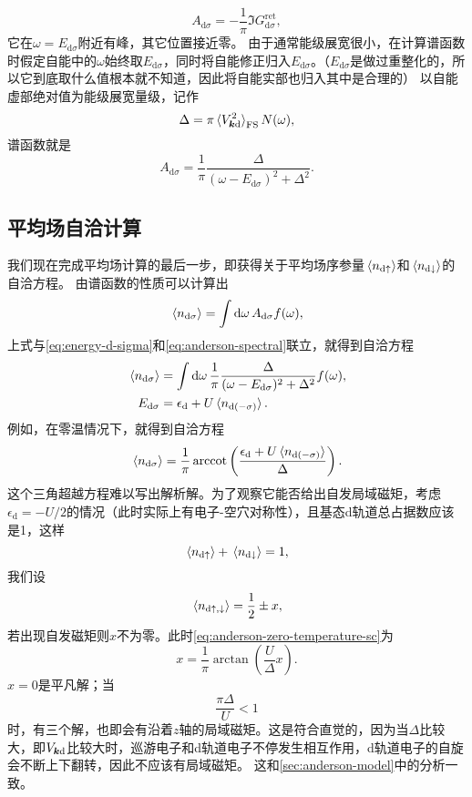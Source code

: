 \[
    A_{\text{d} \sigma} = -\frac{1}{\pi} \Im G_{\text{d} \sigma}^\text{ret},
\]
它在$\omega = E_{\text{d} \sigma}$附近有峰，其它位置接近零。
由于通常能级展宽很小，在计算谱函数时假定自能中的$\omega$始终取$E_{\text{d} \sigma}$，同时将自能修正归入$E_{\text{d} \sigma}$。（$E_{\text{d} \sigma}$是做过重整化的，所以它到底取什么值根本就不知道，因此将自能实部也归入其中是合理的）
以自能虚部绝对值为能级展宽量级，记作
\begin{equation}
    \Delta = \pi \expval*{V_{\vb*{k} \text{d}}^2}_\text{FS} N(\omega),
\end{equation}
谱函数就是
\begin{equation}
    A_{\text{d}\sigma} = \frac{1}{\pi} \frac{\Delta}{(\omega-E_{\text{d}\sigma})^2 + \Delta^2}.
    \label{eq:anderson-spectral}
\end{equation}

\subsection{平均场自洽计算}

我们现在完成平均场计算的最后一步，即获得关于平均场序参量$\expval*{{n}_{\text{d} \uparrow}}$和$\expval*{{n}_{\text{d} \downarrow}}$的自洽方程。
由谱函数的性质可以计算出
\[
    \expval*{{n}_{\text{d} \sigma}} = \int \dd{\omega} A_{\text{d} \sigma} f(\omega),
\]
上式与\eqref{eq:energy-d-sigma}和\eqref{eq:anderson-spectral}联立，就得到自洽方程
\begin{equation}
    \begin{aligned}
        \expval*{{n}_{\text{d} \sigma}} &= \int \dd{\omega} \frac{1}{\pi} \frac{\Delta}{(\omega-E_{\text{d}\sigma})^2 + \Delta^2} f(\omega), \\
        E_{\text{d} \sigma} &= \epsilon_\text{d} + U \expval*{{n}_{\text{d} (-\sigma)}}.
    \end{aligned}
\end{equation}
例如，在零温情况下，就得到自洽方程
\begin{equation}
    \expval*{{n}_{\text{d} \sigma}} = \frac{1}{\pi} \arccot \left( \frac{\epsilon_{\text{d}} + U \expval*{{n}_{\text{d} (-\sigma)}}}{\Delta} \right).
    \label{eq:anderson-zero-temperature-sc}
\end{equation}
这个三角超越方程难以写出解析解。为了观察它能否给出自发局域磁矩，考虑$\epsilon_{\text{d}} = - U / 2$的情况（此时实际上有电子-空穴对称性），且基态d轨道总占据数应该是1，这样
\[
    \expval*{{n}_{\text{d} \uparrow}} + \expval*{{n}_{\text{d} \downarrow}} = 1,
\]
我们设
\[
    \expval*{{n}_{\text{d} \uparrow, \downarrow}} = \frac{1}{2} \pm x,
\]
若出现自发磁矩则$x$不为零。此时\eqref{eq:anderson-zero-temperature-sc}为
\[
    x = \frac{1}{\pi} \arctan \left( \frac{U}{\Delta} x \right).
\]
$x=0$是平凡解；当
\[
    \frac{\pi \Delta}{U} < 1
\]
时，有三个解，也即会有沿着$z$轴的局域磁矩。这是符合直觉的，因为当$\Delta$比较大，即$V_{\vb*{k} \text{d}}$比较大时，巡游电子和d轨道电子不停发生相互作用，d轨道电子的自旋会不断上下翻转，因此不应该有局域磁矩。
这和\autoref{sec:anderson-model}中的分析一致。

